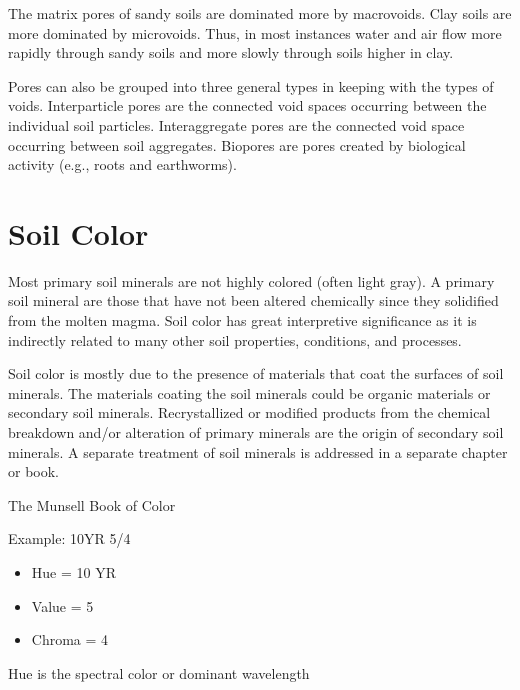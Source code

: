 \documentclass[a5paper]{report}
\begin{document}
The matrix pores of sandy soils are dominated more by macrovoids. Clay soils are more dominated by microvoids. Thus, in most instances water and air flow more rapidly through sandy soils and more slowly through soils higher in clay.

Pores can also be grouped into three general types in keeping with the types of voids. Interparticle pores are the connected void spaces occurring between the individual soil particles. Interaggregate pores are the connected void space occurring between soil aggregates. Biopores are pores created by biological activity (e.g., roots and earthworms).

\section{Soil Color}
\label{color}
    
Most primary soil minerals are not highly colored (often light gray). A primary soil mineral are those that have not been altered chemically since they solidified from the molten magma. Soil color has great interpretive significance as it is indirectly related to many other soil properties, conditions, and processes.

Soil color is mostly due to the presence of materials that coat the surfaces of soil minerals. The materials coating the soil minerals could be organic materials or secondary soil minerals. Recrystallized or modified products from the chemical breakdown and/or alteration of primary minerals are the origin of secondary soil minerals. A separate treatment of soil minerals is addressed in a separate chapter or book. 

    
The Munsell Book of Color
    
Example: 10YR 5/4
    
\begin{itemize}
    \item Hue = 10 YR
    \item Value = 5
    \item Chroma = 4
\end{itemize}
    
Hue is the spectral color or dominant wavelength
    
\end{document}
